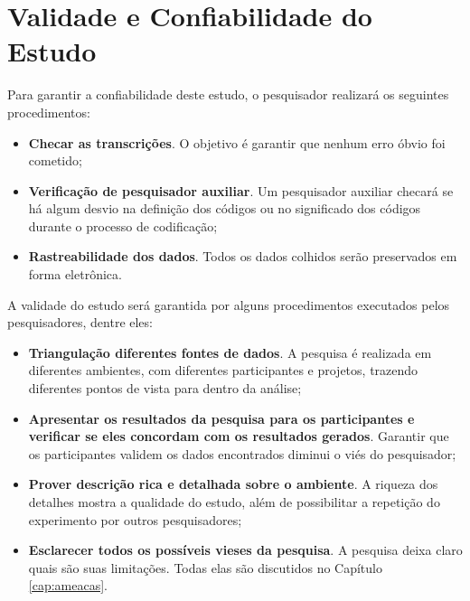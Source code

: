 \section{Validade e Confiabilidade do Estudo}
\label{sec:planejamento-validacao}

Para garantir a confiabilidade deste estudo, o pesquisador realizará os
seguintes procedimentos:

\begin{itemize}
	\item \textbf{Checar as transcrições}. O objetivo é garantir que nenhum erro
	óbvio foi cometido;

	\item \textbf{Verificação de pesquisador auxiliar}. Um pesquisador auxiliar
	checará se há algum desvio na definição dos códigos ou no significado dos códigos 
	durante o processo de codificação;
	
	\item \textbf{Rastreabilidade dos dados}. Todos os dados colhidos serão
	preservados em forma eletrônica.

\end{itemize}

A validade do estudo será garantida por alguns procedimentos executados pelos
pesquisadores, dentre eles:

\begin{itemize}
	\item \textbf{Triangulação diferentes fontes de dados}. A pesquisa é
	realizada em diferentes ambientes, com diferentes participantes e projetos,
	trazendo diferentes pontos de vista para dentro da análise;

	\item \textbf{Apresentar os resultados da pesquisa para os participantes e
	verificar se eles concordam com os resultados gerados}. Garantir que os
	participantes validem os dados encontrados diminui o viés do pesquisador;

	\item \textbf{Prover descrição rica e detalhada sobre o ambiente}. A riqueza
	dos detalhes mostra a qualidade do estudo, além de possibilitar a repetição do
	experimento por outros pesquisadores;

	\item \textbf{Esclarecer todos os possíveis vieses da pesquisa}. A pesquisa
	deixa claro quais são suas limitações. Todas elas são discutidos no Capítulo
	\ref{cap:ameacas}.

\end{itemize}

